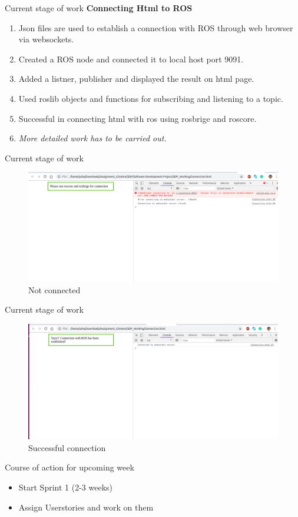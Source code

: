 \documentclass[aspectratio=169]{beamer}
\begin{document}
\begin{frame}{Current stage of work}
\vspace*{-10mm}
\linespread{1.5}
	\textbf{Connecting Html to ROS}
	\begin{enumerate}
\item Json files are used to establish a connection with ROS through web browser via websockets.
\item Created a ROS node and connected it to local host port 9091.
\item Added a listner, publisher and displayed the result on html page.
\item Used roslib objects  and functions for subscribing and listening to a topic.
\item Successful in connecting html with ros using rosbrige and roscore.
\item \textit{ More detailed work has to be carried out.}
	\end{enumerate}
\end{frame}

\begin{frame}{Current stage of work}
\begin{figure}
  \includegraphics[width=0.8\linewidth]{notConnected.png}
  \caption{Not connected}
  \label{fig:Not Connected}
\end{figure}
\end{frame}

\begin{frame}{Current stage of work}
\begin{figure}
  \includegraphics[width=0.8\linewidth]{Connection.png}
  \caption{Successful connection}
  \label{fig:Connected}
\end{figure}
\end{frame}

\begin{frame}{Course of action for upcoming week}
\vspace*{-15mm}
\linespread{2}
	\begin{itemize}
	\item Start Sprint 1 (2-3 weeks)
	\item Assign Userstories and work on them
	\end{itemize}
\end{frame}
\end{document}
